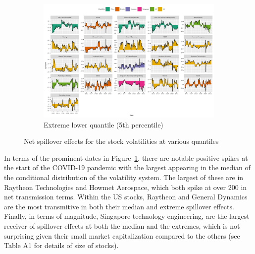 \documentclass[
  letterpaper,
  DIV=11,
  numbers=noendperiod]{scrartcl}
\begin{document}
\begin{figure}
{\begin{figure}[H]
\end{figure}

\begin{figure}[H]

{\centering \includegraphics[width=6.75in,height=\textheight]{plots/fig-volnet5.png}

}

\caption{Extreme lower quantile (5th percentile)}

\end{figure}

}

\caption{\label{fig-netvol}Net spillover effects for the stock
volatilities at various quantiles}

\end{figure}

In terms of the prominent dates in Figure~\ref{fig-netvol}, there are
notable positive spikes at the start of the COVID-19 pandemic with the
largest appearing in the median of the conditional distribution of the
volatility system. The largest of these are in Raytheon Technologies and
Howmet Aerospace, which both spike at over 200 in net transmission
terms. Within the US stocks, Raytheon and General Dynamics are the most
transmitive in both their median and extreme spillover effects. Finally,
in terms of magnitude, Singapore technology engineering, are the largest
receiver of spillover effects at both the median and the extremes, which
is not surprising given their small market capitalization compared to
the others (see Table A1 for details of size of stocks).
\end{document}
